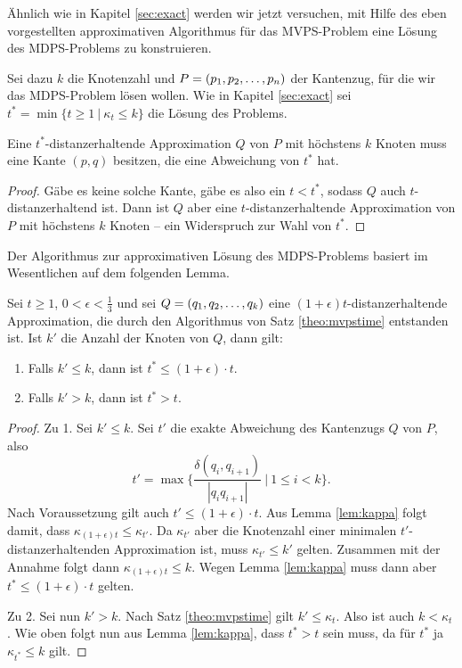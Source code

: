Ähnlich wie in Kapitel \ref{sec:exact} werden wir jetzt versuchen, mit Hilfe des eben vorgestellten approximativen Algorithmus für das MVPS-Problem eine Lösung des MDPS-Problems zu konstruieren.
	
Sei dazu $k$ die Knotenzahl und $P = (p_1, p_2, \mathellipsis, p_n)$ der Kantenzug, für die wir das MDPS-Problem lösen wollen. 
Wie in Kapitel \ref{sec:exact} sei $t^* = \min\{t \geq 1\ |\ \kappa_t \leq k\}$ die Lösung des Problems. 
\begin{lemma}
	\label{lem:tstaredge}
	Eine $t^*$-distanzerhaltende Approximation $Q$ von $P$ mit höchstens $k$ Knoten muss eine Kante $(p, q)$ besitzen, die eine Abweichung von $t^*$ hat.
\end{lemma}
\begin{proof}
	Gäbe es keine solche Kante, gäbe es also ein $t < t^*$, sodass $Q$ auch $t$-distanzerhaltend ist. Dann ist $Q$ aber eine $t$-distanzerhaltende Approximation von $P$ mit höchstens $k$ Knoten -- ein Widerspruch zur Wahl von $t^*$.
\end{proof}
Der Algorithmus zur approximativen Lösung des MDPS-Problems basiert im Wesentlichen auf dem folgenden Lemma.

\begin{lemma}
	\label{lem:tstar}
	Sei $t \geq 1$, $0 < \epsilon < \frac{1}{3}$ und sei $Q = (q_1, q_2, \mathellipsis, q_k)$ eine $(1 + \epsilon)t$-distanzerhaltende Approximation, die durch den Algorithmus von Satz \ref{theo:mvpstime} entstanden ist. 
	Ist $k'$ die Anzahl der Knoten von $Q$, dann gilt:
	\begin{enumerate}
		\item Falls $k' \leq k$, dann ist $t^* \leq (1 + \epsilon) \cdot t$.
		\item Falls $k' > k$, dann ist $t^* > t$.
	\end{enumerate}
\end{lemma}
\begin{proof}
	Zu 1. Sei $k' \leq k$. Sei $t'$ die exakte Abweichung des Kantenzugs $Q$ von $P$, also 
	\[
	t' = \max\{\frac{\delta(q_i, q_{i+1})}{|q_iq_{i+1}|}\ |\ 1 \leq i < k\}.
	\] 
	Nach Voraussetzung gilt auch $t' \leq (1 + \epsilon) \cdot t$. 
	Aus Lemma \ref{lem:kappa} folgt damit, dass $\kappa_{(1 + \epsilon)t} \leq \kappa_{t'}$.
	Da $\kappa_{t'}$ aber die Knotenzahl einer minimalen $t'$-distanzerhaltenden Approximation ist, muss $\kappa_{t'} \leq k'$ gelten. Zusammen mit der Annahme folgt dann $\kappa_{(1 + \epsilon)t} \leq k$. Wegen Lemma \ref{lem:kappa} muss dann aber $t^* \leq (1 + \epsilon) \cdot t$ gelten.
	
	Zu 2. Sei nun $k' > k$. Nach Satz \ref{theo:mvpstime} gilt $k' \leq \kappa_t$. Also ist auch $k < \kappa_t$. Wie oben folgt nun aus Lemma \ref{lem:kappa}, dass $t^* > t$ sein muss, da für $t^*$ ja $\kappa_{t^*} \leq k$ gilt.		
\end{proof}

